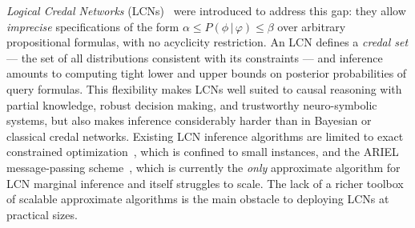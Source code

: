 \documentclass{article}
\begin{document}
\emph{Logical Credal Networks} (LCNs)~\cite{marinescu2022neurips} were introduced to address this gap: they allow \emph{imprecise} specifications of the form $\alpha \leq P(\phi\,|\,\varphi) \leq \beta$ over arbitrary propositional formulas, with no acyclicity restriction. An LCN defines a \emph{credal set} --- the set of all distributions consistent with its constraints --- and inference amounts to computing tight lower and upper bounds on posterior probabilities of query formulas. This flexibility makes LCNs well suited to causal reasoning with partial knowledge, robust decision making, and trustworthy neuro-symbolic systems, but also makes inference considerably harder than in Bayesian or classical credal networks. Existing LCN inference algorithms are limited to exact constrained optimization~\cite{marinescu2022neurips}, which is confined to small instances, and the ARIEL message-passing scheme~\cite{marinescu2023lcn}, which is currently the \emph{only} approximate algorithm for LCN marginal inference and itself struggles to scale. The lack of a richer toolbox of scalable approximate algorithms is the main obstacle to deploying LCNs at practical sizes.
\end{document}
